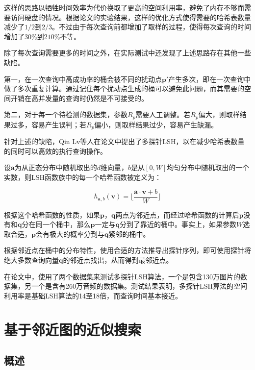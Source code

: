 这样的思路以牺牲时间效率为代价换取了更高的空间利用率，避免了内存不够而需要访问硬盘的情况。根据论文\parencite{lv2007multi}的实验结果，这样的优化方式使得需要的哈希表数量减少了$1/2$到$2/3$。不过由于每次查询前都增加了取样的过程，使得每次查询的时间增加了$30\%$到$210\%$不等。

除了每次查询需要更多的时间之外，在实际测试中还发现了上述思路存在其他一些缺陷。

第一，在一次查询中高成功率的桶会被不同的扰动点$\mathbf{p'}$产生多次，即在一次查询中做了多次重复计算。通过记住每个扰动点生成的桶可以避免此问题，而其需要的空间开销在高并发量的查询时仍然是不可接受的。

第二，对于每一个待检测的数据集，参数$R_p$需要人工调整。若$R_p$偏大，则取样结果过多，容易产生误判；若$R_p$偏小，则取样结果过少，容易产生缺漏。

针对上述的缺陷，Qin Lv等人在论文\parencite{lv2007multi}中提出了多探针LSH，以在减少哈希表数量的同时可以高效的执行查询操作。

设$\mathbf{a}$为从正态分布中随机取出的$d$维向量，$b$是从$[0,W]$均匀分布中随机取出的一个实数，则LSH函数族中的每一个哈希函数被定义为：

\begin{equation}
	h_{\mathbf{a},b}(\mathbf{v})=\Big\lfloor\frac{\mathbf{a}\cdot \mathbf{v}+b}{W} \Big\rfloor
\end{equation}

根据这个哈希函数的性质，如果$\mathbf{p}$，$\mathbf{q}$两点为邻近点，而经过哈希函数的计算后$\mathbf{p}$没有和$\mathbf{q}$分在同一个桶中，那么$\mathbf{p}$一定与$\mathbf{q}$分到了靠近的桶中。事实上，如果参数$W$选取合适，$\mathbf{p}$会有极大的概率分到与$\mathbf{q}$紧邻的桶中。

根据邻近点在桶中的分布特性，使用合适的方法推导出探针序列，即可使用探针将绝大多数查询向量$\mathbf{q}$的邻近点找出，从而得到最邻近点。

在论文\parencite{lv2007multi}中，使用了两个数据集来测试多探针LSH算法，一个是包含130万图片的数据集，另一个是含有260万音频的数据集。测试结果表明，多探针LSH算法的空间利用率是基础LSH算法的14至18倍，而查询时间基本接近。


\section{基于邻近图的近似搜索}

\subsection{概述}

